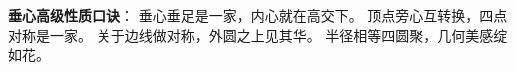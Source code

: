\begin{summarybox}
\textbf{垂心高级性质口诀}：
垂心垂足是一家，内心就在高交下。
顶点旁心互转换，四点对称是一家。
关于边线做对称，外圆之上见其华。
半径相等四圆聚，几何美感绽如花。
\end{summarybox}